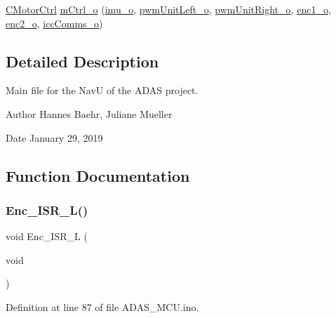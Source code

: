 \begin{DoxyCompactItemize}
\mbox{\hyperlink{class_c_motor_ctrl}{C\+Motor\+Ctrl}} \mbox{\hyperlink{_a_d_a_s___m_c_u_8ino_a60ac8587f0c0967b5e3056da59168874}{m\+Ctrl\+\_\+o}} (\mbox{\hyperlink{_a_d_a_s___m_c_u_8ino_ae51e36f83228f859afeb8a72e60339a6}{imu\+\_\+o}}, \mbox{\hyperlink{_a_d_a_s___m_c_u_8ino_a10a570a59ef56c08699c4fec61d47d16}{pwm\+Unit\+Left\+\_\+o}}, \mbox{\hyperlink{_a_d_a_s___m_c_u_8ino_a49af1ef8724d9cb785e37641bb0cdc6b}{pwm\+Unit\+Right\+\_\+o}}, \mbox{\hyperlink{_a_d_a_s___m_c_u_8ino_ad90699f8fbb0fa8f734ae5c30885ee3b}{enc1\+\_\+o}}, \mbox{\hyperlink{_a_d_a_s___m_c_u_8ino_a54cfc96aae4913b87ab356a0665557a5}{enc2\+\_\+o}}, \mbox{\hyperlink{_a_d_a_s___m_c_u_8ino_a62ef6b3308259edb69af585549178324}{icc\+Comms\+\_\+o}})
\end{DoxyCompactItemize}


\subsection{Detailed Description}
Main file for the NavU of the A\+D\+AS project. 

\begin{DoxyAuthor}{Author}
Hannes Baehr, Juliane Mueller 
\end{DoxyAuthor}
\begin{DoxyDate}{Date}
January 29, 2019 
\end{DoxyDate}


\subsection{Function Documentation}
\mbox{\label{_a_d_a_s___m_c_u_8ino_a89c135c3ad9390c0a5c08c78a9c985d1}} 
\subsubsection{\texorpdfstring{Enc\+\_\+\+I\+S\+R\+\_\+\+L()}{Enc\_ISR\_L()}}
{\footnotesize\ttfamily void Enc\+\_\+\+I\+S\+R\+\_\+L (\begin{DoxyParamCaption}\item[{void}]{ }\end{DoxyParamCaption})}



Definition at line 87 of file A\+D\+A\+S\+\_\+\+M\+C\+U.\+ino.

